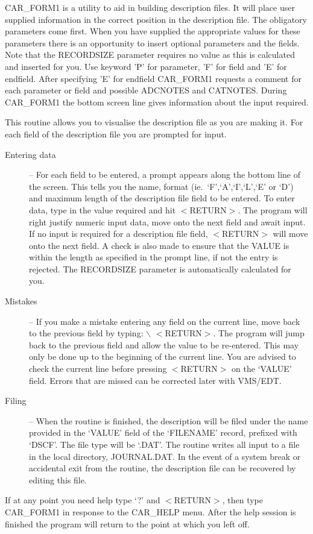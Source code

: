 CAR\_FORM1 is a utility to aid in building description files. It will place 
user supplied information in the correct position in the description file.
The obligatory parameters come first. When you have supplied the appropriate
values for these parameters there is an opportunity to insert optional 
parameters and the fields. Note that the RECORDSIZE parameter requires no
value as this is calculated and inserted for you. Use keyword 'P' for
parameter, 'F' for field and 'E' for endfield. After specifying 'E' for 
endfield CAR\_FORM1 requests a comment for each parameter or field and
possible ADCNOTES and CATNOTES. During CAR\_FORM1 the bottom screen line
gives information about the input required. 

This routine allows you to visualise the description file as you are 
making it.
For each field of the description file you are prompted for input.
\begin{description}
\item [Entering data] --
For each field to be entered, a prompt appears along the bottom line of the
screen.
This tells you the name, format (ie.\ `F',`A',`I',`L',`E' or `D') and maximum 
length of the description file field to be entered.
To enter data, type in the value required and hit $<$RETURN$>$.
The program will right justify numeric input data, move onto the next field
and await input.
If no input is required for a description file field, $<$RETURN$>$ will move 
onto the next field.
A check is also made to ensure that the VALUE is within the length as
specified in the prompt line, if not the entry is rejected. 
The RECORDSIZE parameter is automatically calculated for you.
\item [Mistakes] --
If you make a mistake entering any field on the current line, move back to the
previous field by typing: $\backslash$ $<$RETURN$>$.
The program will jump back to the previous field and allow the value to be
re-entered.
This may only be done up to the beginning of the current line.
You are advised to check the current line before pressing $<$RETURN$>$ on the
`VALUE' field.
Errors that are missed can be corrected later with VMS/EDT.
\item [Filing] --
When the routine is finished, the description will be filed under the name
provided in the `VALUE' field of the `FILENAME' record, prefixed with `DSCF'.
The file type will be `.DAT'.
The routine writes all input to a file in the local directory, JOURNAL.DAT.
In the event of a system break or accidental exit from the routine, the
description file can be recovered by editing this file.
\end{description}
If at any point you need help type `?' and $<$RETURN$>$, then type 
CAR\_FORM1 in response to the CAR\_HELP menu. 
After the help session is finished the program will return to the point 
at which you left off.
 
